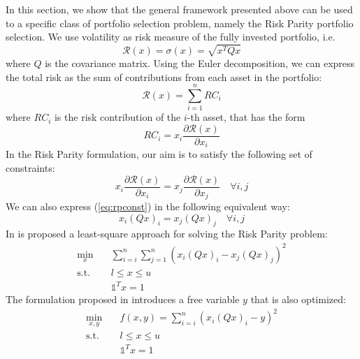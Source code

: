 In this section, we show that the general framework presented above can be used to a specific class of portfolio selection problem, namely the Risk Parity portfolio selection. We use volatility as risk measure of the fully invested portfolio, i.e.
\begin{equation}
\mathcal{R}(x) = \sigma(x) = \sqrt{x^T Q x}
\end{equation}
where $Q$ is the covariance matrix. Using the Euler decomposition, we can express the total risk as the sum of contributions from each asset in the portfolio:
\begin{equation}
\mathcal{R}(x) = \sum_{i=1}^n RC_i 
\end{equation}
where $RC_i$ is the risk contribution of the $i$-th asset, that has the form
\begin{equation}
RC_i = x_i \frac{\partial \mathcal{R}(x)}{\partial x_i}
\end{equation}
In the Risk Parity formulation, our aim is to satisfy the following set of constraints:
\begin{equation}\label{eq:rpconst}
x_i \frac{\partial \mathcal{R}(x)}{\partial x_i}= x_j \frac{\partial \mathcal{R}(x)}{\partial x_j} \quad \forall i,j
\end{equation}
We can also express (\ref{eq:rpconst}) in the following equivalent way:
\begin{equation}
x_i (Q x)_i = x_j (Q x)_j \quad \forall i,j
\end{equation}
In \cite{maillard} is proposed a least-square approach for solving the Risk Parity problem:
\begin{subequations}
\begin{align}
\min_x & \quad \sum_{i=i}^n \sum_{j=1}^{n}\left(x_i(Q x)_i - x_j(Q x)_j\right)^2\\
\text{s.t.} & \quad l \leq x \leq u \\
& \quad \mathds{1}^T x = 1 
\end{align}
\end{subequations}
The formulation proposed in \cite{tutuncu} introduces a free variable $y$ that is also optimized:
\begin{subequations}\label{eq:problemRP} 
\begin{align}
\min_{x,y} & \quad f(x,y) =  \sum_{i=i}^n \left(x_i(Q x)_i - y\right)^2 \\
\text{s.t.} & \quad l \leq x \leq u \\
& \quad \mathds{1}^T x = 1 
\end{align}
\end{subequations}

